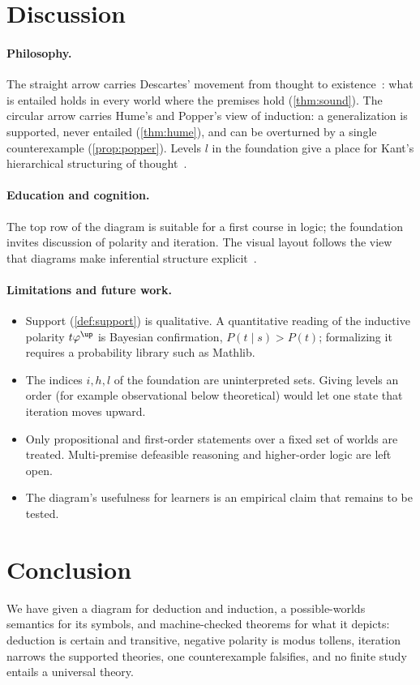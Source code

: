 \section{Discussion}\label{sec:discussion}

\paragraph{Philosophy.} The straight arrow carries Descartes' movement from thought to
existence~\cite{descartes}: what is entailed holds in every world where the premises hold
(\cref{thm:sound}). The circular arrow carries Hume's and Popper's view of induction: a
generalization is supported, never entailed (\cref{thm:hume}), and can be overturned by a single
counterexample (\cref{prop:popper}). Levels $l$ in the foundation give a place for Kant's
hierarchical structuring of thought~\cite{kant}.

\paragraph{Education and cognition.} The top row of the diagram is suitable for a first course in
logic; the foundation invites discussion of polarity and iteration. The visual layout follows
the view that diagrams make inferential structure explicit~\cite{larkin,johnsonlaird}.

\paragraph{Limitations and future work.}
\begin{itemize}
  \item Support (\cref{def:support}) is qualitative. A quantitative reading of the inductive
        polarity $t\varphi^{\up}$ is Bayesian confirmation, $P(t\mid s)>P(t)$; formalizing it
        requires a probability library such as Mathlib.
  \item The indices $i,h,l$ of the foundation are uninterpreted sets. Giving levels an order
        (for example observational below theoretical) would let one state that iteration moves
        upward.
  \item Only propositional and first-order statements over a fixed set of worlds are treated.
        Multi-premise defeasible reasoning and higher-order logic are left open.
  \item The diagram's usefulness for learners is an empirical claim that remains to be tested.
\end{itemize}

\section{Conclusion}

We have given a diagram for deduction and induction, a possible-worlds semantics for its symbols,
and machine-checked theorems for what it depicts: deduction is certain and transitive, negative
polarity is modus tollens, iteration narrows the supported theories, one counterexample falsifies,
and no finite study entails a universal theory.
